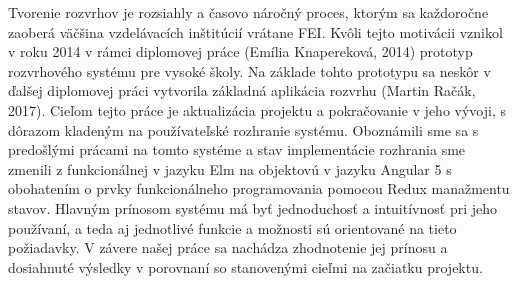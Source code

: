 Tvorenie rozvrhov je rozsiahly a časovo náročný proces, ktorým sa každoročne zaoberá väčšina vzdelávacích inštitúcií vrátane FEI. Kvôli tejto motivácii vznikol v roku 2014 v rámci diplomovej práce  (Emília Knapereková, 2014) prototyp rozvrhového systému pre vysoké školy. Na základe tohto prototypu sa neskôr v ďalšej diplomovej práci vytvorila základná aplikácia rozvrhu (Martin Račák, 2017). Cieľom tejto práce je aktualizácia projektu a pokračovanie v jeho vývoji, s dôrazom kladeným na používateľské rozhranie systému. Oboznámili sme sa s predošlými prácami na tomto systéme a stav implementácie rozhrania sme zmenili z funkcionálnej v jazyku Elm na objektovú v jazyku Angular 5 s obohatením o prvky funkcionálneho programovania pomocou Redux manažmentu stavov. Hlavným prínosom systému má byť jednoduchosť a intuitívnosť pri jeho používaní, a teda aj jednotlivé funkcie a možnosti sú orientované na tieto požiadavky.
V závere našej práce sa nachádza zhodnotenie jej prínosu a dosiahnuté výsledky v porovnaní so stanovenými cieľmi na začiatku projektu.